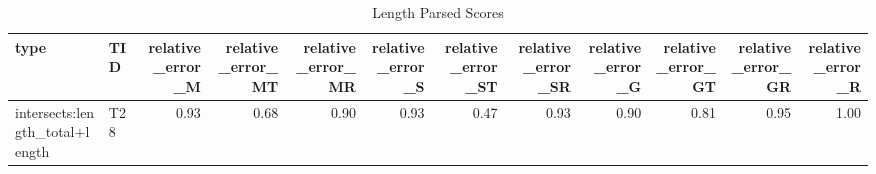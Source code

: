 \begin{table}
\caption{Length Parsed Scores}
\label{tab:length_parsed_scores}
\begin{tabular}{llrrrrrrrrrr}
\hline
type & TID & relative\_error\_M & relative\_error\_MT & relative\_error\_MR & relative\_error\_S & relative\_error\_ST & relative\_error\_SR & relative\_error\_G & relative\_error\_GT & relative\_error\_GR & relative\_error\_R \\
\hline
intersects:length\_total+length & T28 & 0.93 & 0.68 & 0.90 & 0.93 & 0.47 & 0.93 & 0.90 & 0.81 & 0.95 & 1.00 \\
\hline
\end{tabular}
\end{table}
